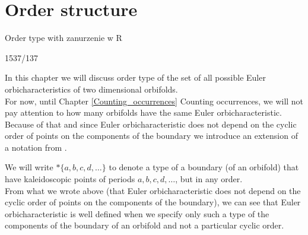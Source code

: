 \chapter{Order structure}

Order type with zanurzenie w R

1537/137

In this chapter we will discuss order type of the set of all possible Euler orbicharacteristics 
of two dimensional orbifolds. \\

For now, until Chapter \ref{Counting_occurrences} Counting occurrences, we will not pay attention 
to how many orbifolds have the same Euler orbicharacteristic. \\ 
Because of that and since Euler orbicharacteristic does not depend on the cyclic order 
of points on the components of the boundary we introduce an extension of a notation from 
\cite{Conway2008}. 


We will write $*\{a,b,c,d,\dots\}$ to denote a type of a boundary (of an orbifold) that have 
kaleidoscopic points of periods $a,b,c,d,\dots$, but in any order. \\


From what we wrote above (that Euler orbicharacteristic does not depend on the cyclic order 
of points on the components of the boundary), we can see that Euler 
orbicharacteristic is well defined 
when we specify only such a type of the components of the boundary of an orbifold and not 
a particular cyclic order.  \\


